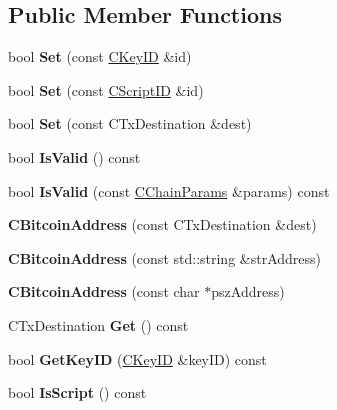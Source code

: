 \subsection*{Public Member Functions}
\begin{DoxyCompactItemize}
\item 
\mbox{\label{class_c_bitcoin_address_abe1614f9ecd143ae69256d65c5edbcab}} 
bool {\bfseries Set} (const \mbox{\hyperlink{class_c_key_i_d}{C\+Key\+ID}} \&id)
\item 
\mbox{\label{class_c_bitcoin_address_abb974c40304444b0f14a005ddb7dac03}} 
bool {\bfseries Set} (const \mbox{\hyperlink{class_c_script_i_d}{C\+Script\+ID}} \&id)
\item 
\mbox{\label{class_c_bitcoin_address_a819dfc6a4866832e2cd2e51c1a245d80}} 
bool {\bfseries Set} (const C\+Tx\+Destination \&dest)
\item 
\mbox{\label{class_c_bitcoin_address_ab39907ce6895062a8f8bf585270ef13b}} 
bool {\bfseries Is\+Valid} () const
\item 
\mbox{\label{class_c_bitcoin_address_a0c6030891dae71881944f93774fa907e}} 
bool {\bfseries Is\+Valid} (const \mbox{\hyperlink{class_c_chain_params}{C\+Chain\+Params}} \&params) const
\item 
\mbox{\label{class_c_bitcoin_address_a4c9c03791561557b8a1926567456712e}} 
{\bfseries C\+Bitcoin\+Address} (const C\+Tx\+Destination \&dest)
\item 
\mbox{\label{class_c_bitcoin_address_a23f7116fe3a89ab9a551f1d8c29469da}} 
{\bfseries C\+Bitcoin\+Address} (const std\+::string \&str\+Address)
\item 
\mbox{\label{class_c_bitcoin_address_ac0fd8d46f815948d471a8896997a3211}} 
{\bfseries C\+Bitcoin\+Address} (const char $\ast$psz\+Address)
\item 
\mbox{\label{class_c_bitcoin_address_a1e44de10dfc84d1fd2e15150f1e22b8e}} 
C\+Tx\+Destination {\bfseries Get} () const
\item 
\mbox{\label{class_c_bitcoin_address_af3d7c4547803b09144fc040320f687dd}} 
bool {\bfseries Get\+Key\+ID} (\mbox{\hyperlink{class_c_key_i_d}{C\+Key\+ID}} \&key\+ID) const
\item 
\mbox{\label{class_c_bitcoin_address_a9547fc1ef7cfc2288904e7eedab57a10}} 
bool {\bfseries Is\+Script} () const
\end{DoxyCompactItemize}
